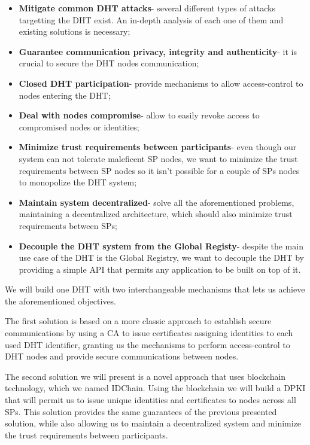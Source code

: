 \begin{itemize}
  \item \textbf{Mitigate common \ac{DHT} attacks}- several different types of attacks targetting the \ac{DHT} exist. An in-depth analysis of each one of them and existing solutions is necessary;
	\item \textbf{Guarantee communication privacy, integrity and authenticity}- it is crucial to secure the \ac{DHT} nodes communication;
	\item \textbf{Closed DHT participation}- provide mechanisms to allow access-control to nodes entering the \ac{DHT};
	\item \textbf{Deal with nodes compromise}- allow to easily revoke access to compromised nodes or identities;
  \item \textbf{Minimize trust requirements between participants}- even though our system can not tolerate maleficent \ac{SP} nodes, we want to minimize the trust requirements between \ac{SP} nodes so it isn't possible for a couple of \acp{SP} nodes to monopolize the DHT system;
  \item \textbf{Maintain system decentralized}- solve all the aforementioned problems, maintaining a decentralized architecture, which should also minimize trust requirements between \acp{SP};
  \item \textbf{Decouple the DHT system from the Global Registy}- despite the main use case of the DHT is the Global Registry, we want to decouple the DHT by providing a simple \ac{API} that permits any application to be built on top of it.
\end{itemize}

We will build one DHT with two interchangeable mechanisms that lets us achieve the aforementioned objectives.

The first solution is based on a more classic approach to establish secure communications by using a \acl{CA} to issue certificates assigning identities to each used DHT identifier, granting us the mechanisms to perform access-control to \ac{DHT} nodes and provide secure communications between nodes.

The second solution we will present is a novel approach that uses blockchain technology, which we named IDChain.
Using the blockchain we will build a \ac{DPKI} that will permit us to issue unique identities and certificates to nodes across all \acp{SP}.
This solution provides the same guarantees of the previous presented solution, while also allowing us to maintain a decentralized system and minimize the trust requirements between participants.

